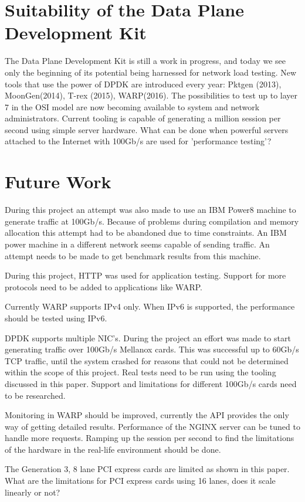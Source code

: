 \section{Suitability of the Data Plane Development Kit}
The Data Plane Development Kit is still a work in progress, and today we see only the beginning of its potential being harnessed for network load testing. New tools that use the power of DPDK are introduced every year:
Pktgen (2013), MoonGen(2014), T-rex (2015), WARP(2016).
The possibilities to test up to layer 7 in the OSI model are now becoming available to system and network administrators. 
Current tooling is capable of generating a million session per second using simple server hardware. 
What can be done when powerful servers attached to the Internet with 100Gb/s are used for 'performance testing'?  

\section{Future Work}
During this project an attempt was also made to use an IBM Power8 machine to generate traffic at 100Gb/s. Because of problems during compilation and memory allocation this attempt had to be abandoned due to time constraints.
An IBM power machine in a different network seems capable of sending traffic. An attempt needs to be made to get benchmark results from this machine.

During this project, HTTP was used for application testing. Support for more protocols need to be added to applications like WARP. 

Currently WARP supports IPv4 only. When IPv6 is supported, the performance should be tested using IPv6. 

DPDK supports multiple NIC's. During the project an effort was made to start generating traffic over 100Gb/s Mellanox cards.
This was successful up to 60Gb/s TCP traffic, until the system crashed for reasons that could not be determined within the scope of this project. Real tests need to be run using the tooling discussed in this paper. 
Support and limitations for different 100Gb/s cards need to be researched.

Monitoring in WARP should be improved, currently the API provides the only way of getting detailed results.
Performance of the NGINX server can be tuned to handle more requests. 
Ramping up the session per second to find the limitations of the hardware in the real-life environment should be done. 

The Generation 3, 8 lane PCI express cards are limited as shown in this paper. What are the limitations for PCI express cards using 16 lanes, does it scale linearly or not?


